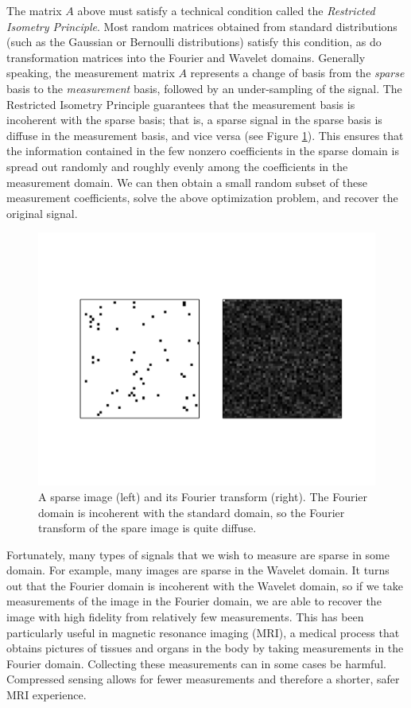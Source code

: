 The matrix $A$ above must satisfy a technical condition called the \emph{Restricted Isometry Principle}. Most
random matrices obtained from standard distributions (such as the Gaussian or Bernoulli distributions) satisfy this
condition, as do transformation matrices into the Fourier and Wavelet domains. Generally speaking,
the measurement matrix $A$ represents a change of basis from the \emph{sparse} basis to the \emph{measurement} basis, 
followed by an under-sampling of the signal. The Restricted Isometry Principle guarantees that the measurement
basis is incoherent with the sparse basis; that is, a sparse signal in the sparse basis is diffuse in the measurement
basis, and vice versa (see Figure \ref{fig:incoherent}). This ensures that the information contained in the few nonzero
coefficients in the sparse
domain is spread out randomly and roughly evenly among the coefficients in the measurement domain. 
We can then obtain a small random subset of these measurement coefficients, solve the above optimization problem,
and recover the original signal. 

\begin{figure}
\centering
\includegraphics[width=\textwidth]{incoherent.pdf}
\caption{A sparse image (left) and its Fourier transform (right). The Fourier domain is incoherent with the 
standard domain, so the Fourier transform of the spare image is quite diffuse.}
\label{fig:incoherent}
\end{figure}

Fortunately, many types of signals that we wish to measure are sparse in some domain. For example, many images
are sparse in the Wavelet domain. It turns out that the Fourier domain is incoherent with the Wavelet domain,
so if we take measurements of the image in the Fourier domain, we are able to recover the image with high 
fidelity from relatively few measurements. This has been particularly useful in magnetic resonance imaging 
(MRI), a medical process that obtains pictures of tissues and organs in the body by taking measurements in
the Fourier domain. Collecting these measurements can in some cases be harmful. Compressed sensing
allows for fewer measurements and therefore a shorter, safer MRI experience.

